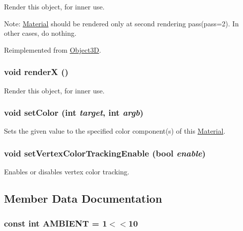 Render this object, for inner use.

Note: \hyperlink{classm3g_1_1Material}{Material} should be rendered only at second rendering pass(pass=2). In other cases, do nothing. 

Reimplemented from \hyperlink{classm3g_1_1Object3D_8babc8a79b78615da51161e94029eea9}{Object3D}.\hypertarget{classm3g_1_1Material_443a7a301f77f625335ecc06d13bad06}{
\subsubsection[{renderX}]{\setlength{\rightskip}{0pt plus 5cm}void renderX ()}}
\label{classm3g_1_1Material_443a7a301f77f625335ecc06d13bad06}


Render this object, for inner use. \hypertarget{classm3g_1_1Material_5947a525a18bca77aa890971df2ae48a}{
\subsubsection[{setColor}]{\setlength{\rightskip}{0pt plus 5cm}void setColor (int {\em target}, \/  int {\em argb})}}
\label{classm3g_1_1Material_5947a525a18bca77aa890971df2ae48a}


Sets the given value to the specified color component(s) of this \hyperlink{classm3g_1_1Material}{Material}. \hypertarget{classm3g_1_1Material_55778ceeb6408e5db698c793dea1edd6}{
\subsubsection[{setVertexColorTrackingEnable}]{\setlength{\rightskip}{0pt plus 5cm}void setVertexColorTrackingEnable (bool {\em enable})}}
\label{classm3g_1_1Material_55778ceeb6408e5db698c793dea1edd6}


Enables or disables vertex color tracking. 

\subsection{Member Data Documentation}
\hypertarget{classm3g_1_1Material_4cf648a82d9de62a1fb15f4277049594}{
\subsubsection[{AMBIENT}]{\setlength{\rightskip}{0pt plus 5cm}const int {\bf AMBIENT} = 1$<$$<$10}}
\label{classm3g_1_1Material_4cf648a82d9de62a1fb15f4277049594}


